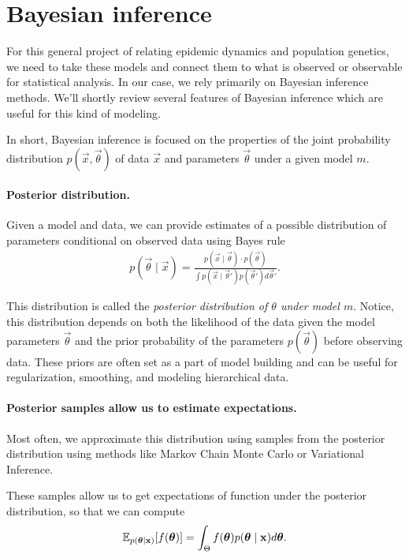 \section{Bayesian inference}%

For this general project of relating epidemic dynamics and population genetics, we need to take these models and connect them to what is observed or observable for statistical analysis.
In our case, we rely primarily on Bayesian inference methods.
We'll shortly review several features of Bayesian inference which are useful for this kind of modeling.

In short, Bayesian inference is focused on the properties of the joint probability distribution  $p(\vec{x}, \vec{\theta})$ of data $\vec{x}$ and parameters $\vec{\theta}$ under a given model $m$.

\paragraph{Posterior distribution.}
Given a model and data, we can provide estimates of a possible distribution of parameters conditional on observed data using Bayes rule
\begin{align*}
p(\vec{\theta} \mid \vec{x}) = \frac{p(\vec{x} \mid \vec{\theta})\cdot p(\vec{\theta})}{\int p(\vec{x} \mid \vec{\theta}') p(\vec{\theta}') d \vec{\theta}'}.
\end{align*}

This distribution is called the \emph{posterior distribution of $\theta$ under model $m$}. 
Notice, this distribution depends on both the likelihood of the data given the model parameters $\vec{\theta}$ and the prior probability of the parameters $p(\vec{\theta})$ before observing data.
These priors are often set as a part of model building and can be useful for regularization, smoothing, and modeling hierarchical data.

\paragraph{Posterior samples allow us to estimate expectations.}%

Most often, we approximate this distribution using samples from the posterior distribution using methods like Markov Chain Monte Carlo or Variational Inference.

These samples allow us to get expectations of function under the posterior distribution, so that we can compute
\begin{align*}
\mathbb{E}_{p(\boldsymbol{\mathbf{\theta}} \mid \boldsymbol{\mathbf{x}})}[f(\boldsymbol{\mathbf{\theta}})] = \int_{\Theta} f(\boldsymbol{\mathbf{\theta}}) p(\boldsymbol{\mathbf{\theta}} \mid \boldsymbol{\mathbf{x}}) d \boldsymbol{\mathbf{\theta}}.
\end{align*}

